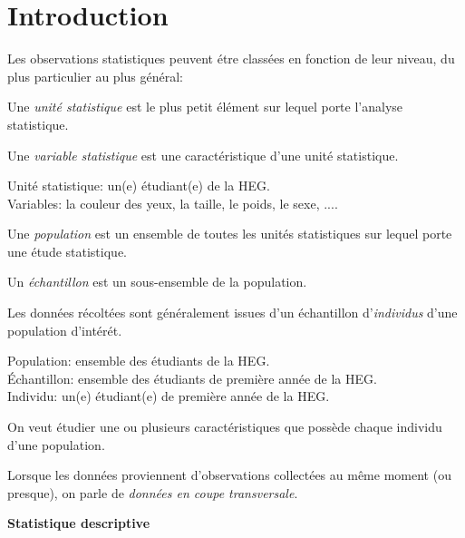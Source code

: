 \chapter{Introduction}

Les observations statistiques peuvent \'etre class\'ees en fonction de leur niveau, du plus particulier au plus g\'en\'eral:\\

\begin{defi}
Une \emph{unit\'e statistique} est le plus petit \'el\'ement sur lequel
porte l'analyse statistique.
\end{defi}
\begin{defi}
Une \emph{variable statistique} est une caract\'eristique d'une
unit\'e statistique.
\end{defi}
\begin{ex}
Unit\'e statistique: un(e) \'etudiant(e) de la HEG.\\
Variables: la couleur des yeux, la taille, le poids, le sexe, ....\\
\end{ex}

\begin{defi}
Une \emph{population} est un ensemble de toutes les unit\'es statistiques sur lequel porte une \'etude
statistique.
\end{defi}
\begin{defi}
Un \emph{\'echantillon} est un sous-ensemble de la population.
\end{defi}
Les donn\'ees r\'ecolt\'ees sont g\'en\'eralement issues d'un \'echantillon
d'\emph{individus} d'une population d'int\'er\'et.

\begin{ex}
Population: ensemble des \'etudiants de la HEG.\\
\'Echantillon: ensemble des \'etudiants de premi\`ere ann\'ee de la HEG.\\
Individu: un(e) \'etudiant(e) de premi\`ere ann\'ee de la HEG.
\end{ex}
On veut \'etudier une ou plusieurs caract\'eristiques que poss\`ede
chaque individu d'une population.

\begin{rem}
Lorsque les donn\'ees proviennent d'observations collect\'ees au m\^{e}me moment (ou presque), on parle de \emph{donn\'ees en coupe transversale}.
\end{rem}

{\bfseries \large Statistique descriptive}

